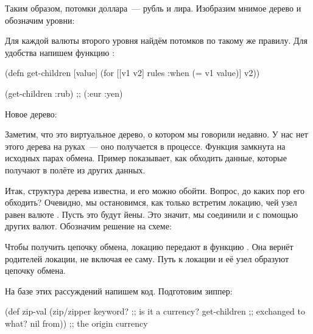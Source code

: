 Таким образом, потомки доллара~--- рубль и лира. Изобразим мнимое дерево и
обозначим уровни:

\begin{figure}[H]
  \centering
  
  \label{fig:chart-zip-14}
\end{figure}

Для каждой валюты второго уровня найдём потомков по такому же правилу. Для
удобства напишем функцию :

\begin{english}
  \begin{clojure}
(defn get-children [value]
  (for [[v1 v2] rules
        :when (= v1 value)]
    v2))

(get-children :rub)
;; (:eur :yen)
  \end{clojure}
\end{english}

Новое дерево:

\begin{figure}[H]
  \centering
  
  \label{fig:chart-zip-15}
\end{figure}

Заметим, что это виртуальное дерево, о котором мы говорили недавно. У нас нет
этого дерева на руках~--- оно получается в процессе. Функция
 замкнута на исходных парах обмена. Пример показывает, как
обходить данные, которые получают в полёте из других данных.

Итак, структура дерева известна, и его можно обойти. Вопрос, до каких пор его
обходить? Очевидно, мы остановимся, как только встретим локацию, чей узел равен
валюте . Пусть это будут йены. Это значит, мы соединили  и
 с помощью других валют. Обозначим решение на схеме:

\begin{figure}[H]
  \centering
  
  \label{fig:chart-zip-16}
\end{figure}

Чтобы получить цепочку обмена, локацию  передают в функцию
. Она вернёт родителей локации, не включая ее саму. Путь к
локации и её узел образуют цепочку обмена.

На базе этих рассуждений напишем код. Подготовим зиппер:

\begin{english}
  \begin{clojure}
(def zip-val
  (zip/zipper keyword?      ;; is it a currency?
              get-children  ;; exchanged to what?
              nil
              from))        ;; the origin currency
  \end{clojure}
\end{english}

